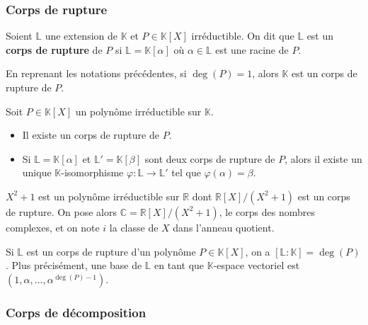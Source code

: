 	\subsubsection{Corps de rupture}


	\begin{definition}
		Soient $\mathbb{L}$ une extension de $\mathbb{K}$ et $P \in \mathbb{K}[X]$ irréductible. On dit que $\mathbb{L}$ est un \textbf{corps de rupture} de $P$ si $\mathbb{L} = \mathbb{K}[\alpha]$ où $\alpha \in \mathbb{L}$ est une racine de $P$.
	\end{definition}

	\begin{example}
		En reprenant les notations précédentes, si $\deg(P) = 1$, alors $\mathbb{K}$ est un corps de rupture de $P$.
	\end{example}

	\begin{theorem}
		Soit $P \in \mathbb{K}[X]$ un polynôme irréductible sur $\mathbb{K}$.
		\begin{itemize}
			\item Il existe un corps de rupture de $P$.
			\item Si $\mathbb{L} = \mathbb{K}[\alpha]$ et $\mathbb{L}' = \mathbb{K}[\beta]$ sont deux corps de rupture de $P$, alors il existe un unique $\mathbb{K}$-isomorphisme $\varphi : \mathbb{L} \rightarrow \mathbb{L}'$ tel que $\varphi(\alpha) = \beta$.
		\end{itemize}
	\end{theorem}

	\begin{application}
		$X^2 + 1$ est un polynôme irréductible sur $\mathbb{R}$ dont $\mathbb{R}[X]/(X^2+1)$ est un corps de rupture. On pose alors $\mathbb{C} = \mathbb{R}[X]/(X^2+1)$, le corps des nombres complexes, et on note $i$ la classe de $X$ dans l'anneau quotient.
	\end{application}

	\begin{remark}
		Si $\mathbb{L}$ est un corps de rupture d'un polynôme $P \in \mathbb{K}[X]$, on a $[\mathbb{L}:\mathbb{K}] = \deg(P)$. Plus précisément, une base de $\mathbb{L}$ en tant que $\mathbb{K}$-espace vectoriel est $(1, \alpha, \dots, \alpha^{\deg(P)-1})$.
	\end{remark}

	\subsubsection{Corps de décomposition}

